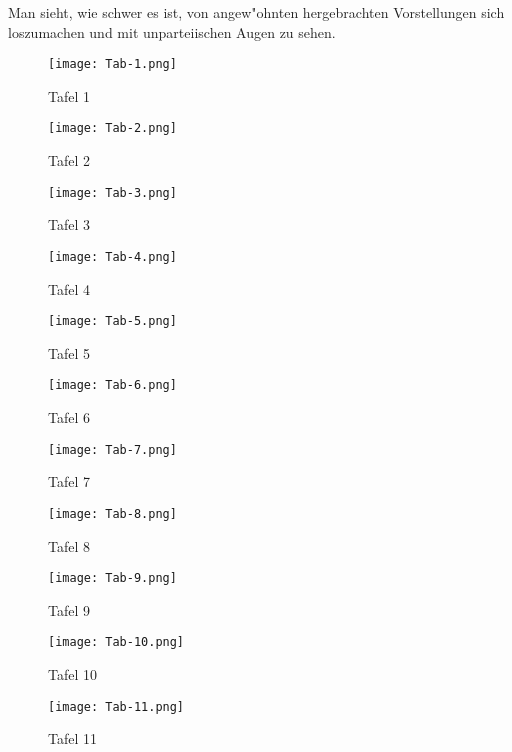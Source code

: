 \documentclass[a4paper, 11pt, oneside, german]{article}
\begin{document}
Man sieht, wie schwer es ist, von angew"ohnten hergebrachten Vorstellungen sich loszumachen und mit unparteiischen Augen zu sehen.
\clearpage
\begin{figure}[b]
\caption{Tafel 1}
\texttt{[image: Tab-1.png]}
\centering
\end{figure}
\clearpage
\begin{figure}[b]
\caption{Tafel 2}
\texttt{[image: Tab-2.png]}
\centering
\end{figure}
\clearpage
\begin{figure}[b]
\caption{Tafel 3}
\texttt{[image: Tab-3.png]}
\centering
\end{figure}
\clearpage
\begin{figure}[b]
\caption{Tafel 4}
\texttt{[image: Tab-4.png]}
\centering
\end{figure}
\clearpage
\begin{figure}[b]
\caption{Tafel 5}
\texttt{[image: Tab-5.png]}
\centering
\end{figure}
\clearpage
\begin{figure}[b]
\caption{Tafel 6}
\texttt{[image: Tab-6.png]}
\centering
\end{figure}
\clearpage
\begin{figure}[b]
\caption{Tafel 7}
\texttt{[image: Tab-7.png]}
\centering
\end{figure}
\clearpage
\begin{figure}[b]
\caption{Tafel 8}
\texttt{[image: Tab-8.png]}
\centering
\end{figure}
\clearpage
\begin{figure}[b]
\caption{Tafel 9}
\texttt{[image: Tab-9.png]}
\centering
\end{figure}
\clearpage
\begin{figure}[b]
\caption{Tafel 10}
\texttt{[image: Tab-10.png]}
\centering
\end{figure}
\clearpage
\begin{figure}[b]
\caption{Tafel 11}
\texttt{[image: Tab-11.png]}
\centering
\end{figure}
\end{document}
